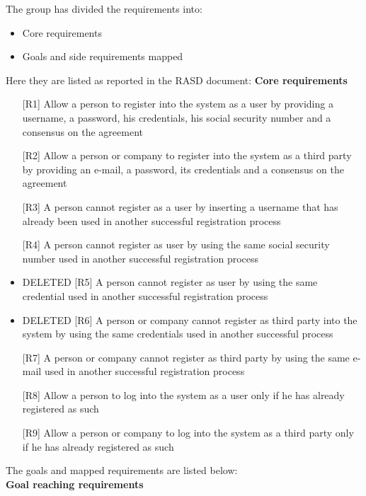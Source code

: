 
The group has divided the requirements into:
\begin{itemize}
    \item Core requirements
    \item Goals and side requirements mapped
\end{itemize}

\noindent Here they are listed as reported in the RASD document:
\newline
\newline
\textbf{Core requirements}
\begin{itemize}
\item [{[R1]}] Allow a person to register into the system as a user by providing a username, a password, his credentials, his social security number and a consensus on the agreement

\item[{[R2]}] Allow a person or company to register into the system as a third party by providing an e-mail, a password, its credentials and a consensus on the agreement
\item[{[R3]}] A person cannot register as a user by inserting a username that has already been used in another successful registration process
\item[{[R4]}] A person cannot register as user by using the same social security number used in another successful registration process 

\item DELETED {[R5] A person cannot register as user by using the same credential used in another successful registration process}
\item DELETED {[R6] A person or company cannot register as third party into the system by using the same credentials used in another successful process}

\item[{[R7]}] A person or company cannot register as third party by using the same e-mail used in another successful registration process

\item[{[R8]}] Allow a person to log into the system as a user only if he has already registered as such
\item[{[R9]}] Allow a person or company to log into the system as a third party only if he has already registered as such
\end{itemize}

\newpage
\noindent The goals and mapped requirements are listed below: \\
\newline
\textbf{Goal reaching requirements}
\par


